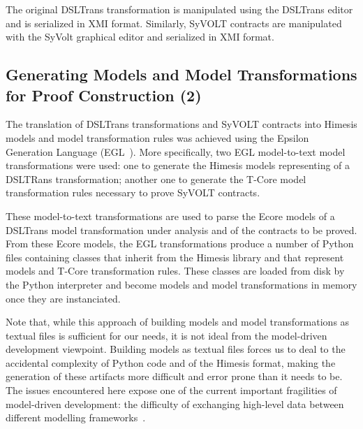 The original DSLTrans transformation is manipulated using the DSLTrans editor
and is serialized in XMI format. Similarly, SyVOLT contracts are manipulated with the SyVolt graphical
editor and serialized in XMI format.


\subsection{Generating Models and Model Transformations for Proof Construction
(2)}
\label{sec:gen_models_mt}

The translation of DSLTrans transformations and SyVOLT contracts into Himesis
models and model transformation rules was achieved using the Epsilon Generation
Language (EGL~\cite{Rose2008}). More specifically, two EGL model-to-text model
transformations were used: one to generate the Himesis models
representing of a DSLTRans transformation; another one to generate the T-Core
model transformation rules necessary to prove SyVOLT contracts.

These model-to-text transformations are used to parse the Ecore models of a
DSLTrans model transformation under analysis and of the contracts to be proved.
From these Ecore models, the EGL transformations produce a number of Python
files containing classes that inherit from the Himesis library and that
represent models and T-Core transformation rules. These classes are loaded from
disk by the Python interpreter and become models and model transformations in
memory once they are instanciated.

Note that, while this approach of building models and model transformations as
textual files is sufficient for our needs, it is not ideal from the model-driven
development viewpoint. Building models as textual files forces us to deal to
the accidental complexity of Python code and of the Himesis format, making the
generation of these artifacts more difficult and error prone than it needs to
be. The issues encountered here expose one of the current important fragilities
of model-driven development: the difficulty of exchanging high-level data
between different modelling frameworks~.



